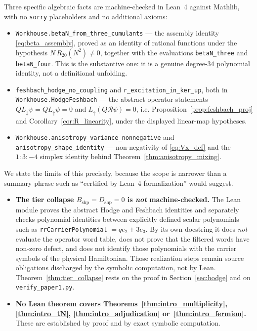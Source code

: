 \documentclass[11pt,a4paper]{article}
\theoremstyle{definition}
\newcommand{\Ldn}{L_{\downarrow}}
\newcommand{\Lup}{L_{\uparrow}}
\newcommand{\Rc}{\mathcal{R}}          %
\newcommand{\Bshp}{B_{\mathrm{shp}}}
\newcommand{\Dshp}{D_{\mathrm{shp}}}
\begin{document}
Three specific algebraic facts are machine-checked in Lean~4 against Mathlib, with no \texttt{sorry} placeholders and no additional axioms:
\begin{itemize}\itemsep2pt
  \item \texttt{Workhouse.betaN\_from\_three\_cumulants} --- the assembly identity \eqref{eq:beta_assembly}, proved as an identity of rational functions under the hypothesis $N\,R_{20}(N^2)\ne0$, together with the evaluations \texttt{betaN\_three} and \texttt{betaN\_four}. This is the substantive one: it is a genuine degree-$34$ polynomial identity, not a definitional unfolding.
  \item \texttt{feshbach\_hodge\_no\_coupling} and \texttt{r\_excitation\_in\_ker\_up}, both in \texttt{Workhouse.HodgeFeshbach} --- the abstract operator statements $Q\Ldn\psi = Q\Lup\psi = 0$ and $\Lup(Q\Rc\psi) = 0$, i.e. Proposition~\ref{prop:feshbach_proj} and Corollary~\ref{cor:R_linearity}, under the displayed linear-map hypotheses.
  \item \texttt{Workhouse.anisotropy\_variance\_nonnegative} and \texttt{anisotropy\_shape\_identity} --- non-negativity of \eqref{eq:Vx_def} and the $1{:}3{:}{-4}$ simplex identity behind Theorem~\ref{thm:anisotropy_mixing}.
\end{itemize}

We state the limits of this precisely, because the scope is narrower than a summary phrase such as ``certified by Lean~4 formalization'' would suggest.
\begin{itemize}\itemsep2pt
  \item \textbf{The tier collapse $\Bshp = \Dshp = 0$ is \emph{not} machine-checked.} The Lean module proves the abstract Hodge and Feshbach identities and separately checks polynomial identities between explicitly defined scalar polynomials such as \texttt{rrCarrierPolynomial} $= q e_2 + 3e_3$. By its own docstring it does \emph{not} evaluate the operator word table, does not prove that the filtered words have non-zero defect, and does not identify those polynomials with the carrier symbols of the physical Hamiltonian. Those realization steps remain source obligations discharged by the symbolic computation, not by Lean. Theorem~\ref{thm:tier_collapse} rests on the proof in Section~\ref{sec:hodge} and on \texttt{verify\_paper1.py}.
  \item \textbf{No Lean theorem covers Theorems~\ref{thm:intro_multiplicity}, \ref{thm:intro_tN}, \ref{thm:intro_adjudication} or~\ref{thm:intro_fermion}.} These are established by proof and by exact symbolic computation.
\end{itemize}
\end{document}
